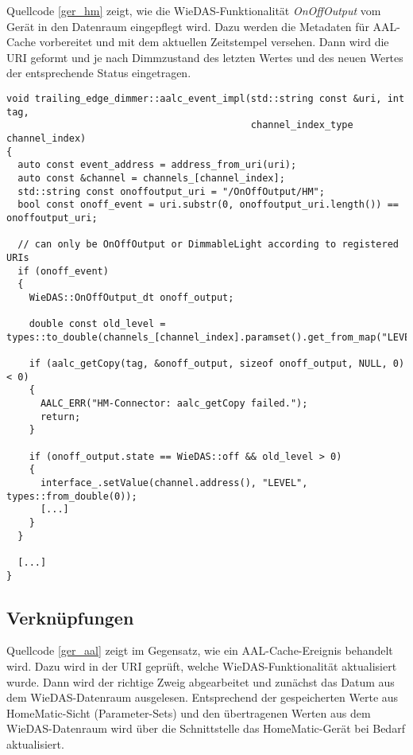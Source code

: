Quellcode \ref{ger_hm} zeigt, wie die WieDAS-Funktionalität \emph{OnOffOutput} vom Gerät
in den Datenraum eingepflegt wird.
Dazu werden die Metadaten für AAL-Cache vorbereitet und mit dem aktuellen Zeitstempel versehen.
Dann wird die URI geformt und je nach Dimmzustand des letzten Wertes und des neuen Wertes
der entsprechende Status eingetragen.

\lstset{language=C++}
\begin{lstlisting}[frame=single,caption={Ausschnitt der Implementierung für die AAL-Cache-Ereignisbehandlung eines Dimmers},label=ger_aal]
void trailing_edge_dimmer::aalc_event_impl(std::string const &uri, int tag,
                                           channel_index_type channel_index)
{
  auto const event_address = address_from_uri(uri);
  auto const &channel = channels_[channel_index];
  std::string const onoffoutput_uri = "/OnOffOutput/HM";
  bool const onoff_event = uri.substr(0, onoffoutput_uri.length()) == onoffoutput_uri;

  // can only be OnOffOutput or DimmableLight according to registered URIs
  if (onoff_event)
  {
    WieDAS::OnOffOutput_dt onoff_output;

    double const old_level = types::to_double(channels_[channel_index].paramset().get_from_map("LEVEL"));

    if (aalc_getCopy(tag, &onoff_output, sizeof onoff_output, NULL, 0) < 0)
    {
      AALC_ERR("HM-Connector: aalc_getCopy failed.");
      return;
    }

    if (onoff_output.state == WieDAS::off && old_level > 0)
    {
      interface_.setValue(channel.address(), "LEVEL", types::from_double(0));
      [...]
    }
  }

  [...]
}
\end{lstlisting}

\subsection{Verknüpfungen}
Quellcode \ref{ger_aal} zeigt im Gegensatz, wie ein AAL-Cache-Ereignis behandelt wird.
Dazu wird in der URI geprüft, welche WieDAS-Funktionalität aktualisiert wurde.
Dann wird der richtige Zweig abgearbeitet und zunächst das Datum aus dem WieDAS-Datenraum ausgelesen.
Entsprechend der gespeicherten Werte aus HomeMatic-Sicht (Parameter-Sets) und den übertragenen Werten
aus dem WieDAS-Datenraum wird über die Schnittstelle das HomeMatic-Gerät bei Bedarf aktualisiert.


